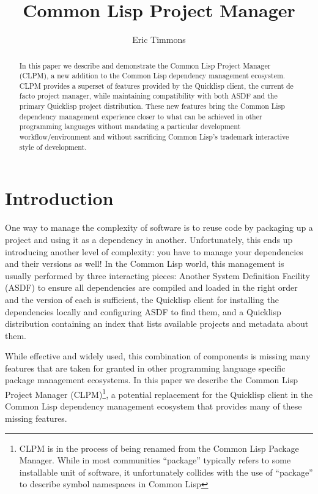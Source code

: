\documentclass[format=sigconf]{acmart}
\title{Common Lisp Project Manager}
\author{Eric Timmons}
\affiliation{
  \institution{CSAIL, Massachusetts Institute of Technology}
  \streetaddress{32 Vassar St}
  \city{Cambridge, MA}
  \country{USA}
}
\begin{document}
\begin{abstract}
  In this paper we describe and demonstrate the Common Lisp Project Manager
  (CLPM), a new addition to the Common Lisp dependency management
  ecosystem. CLPM provides a superset of features provided by the Quicklisp
  client, the current de facto project manager, while maintaining compatibility
  with both ASDF and the primary Quicklisp project distribution. These new
  features bring the Common Lisp dependency management experience closer to
  what can be achieved in other programming languages without mandating a
  particular development workflow/environment and without sacrificing Common
  Lisp's trademark interactive style of development.
\end{abstract}

\maketitle

\section{Introduction}

One way to manage the complexity of software is to reuse code by packaging up a
project and using it as a dependency in another. Unfortunately, this ends up
introducing another level of complexity: you have to manage your dependencies
and their versions as well! In the Common Lisp world, this management is
usually performed by three interacting pieces: Another System Definition
Facility (ASDF) \cite{asdf} to ensure all dependencies are compiled and loaded
in the right order and the version of each is sufficient, the Quicklisp client
\cite{ql} for installing the dependencies locally and configuring ASDF to find
them, and a Quicklisp distribution containing an index that lists available
projects and metadata about them.

While effective and widely used, this combination of components is missing many
features that are taken for granted in other programming language specific
package management ecosystems. In this paper we describe the Common Lisp
Project Manager (CLPM)\footnote{CLPM is in the process of being renamed from
  the Common Lisp Package Manager. While in most communities ``package''
  typically refers to some installable unit of software, it unfortunately
  collides with the use of ``package'' to describe symbol namespaces in Common
  Lisp}, a potential replacement for the Quicklisp client in the Common Lisp
dependency management ecosystem that provides many of these missing features.
\end{document}
